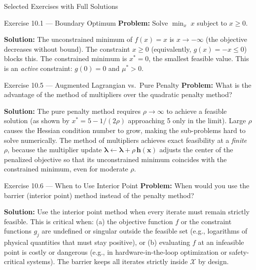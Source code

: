 \documentclass[aspectratio=169,10pt]{beamer}
\newcommand{\bx}{\mathbf{x}}
\newcommand{\blambda}{\bm{\lambda}}
\begin{document}
\begin{frame}[allowframebreaks]{Selected Exercises with Full Solutions}

  \begin{block}{Exercise 10.1 --- Boundary Optimum}
    \textbf{Problem:} Solve $\min_x\; x$ subject to $x \ge 0$.

    \medskip
    \textbf{Solution:}  The unconstrained minimum of $f(x) = x$ is
    $x \to -\infty$ (the objective decreases without bound).  The constraint
    $x \ge 0$ (equivalently, $g(x) = -x \le 0$) blocks this.  The constrained
    minimum is $x^* = 0$, the smallest feasible value.  This is an
    \emph{active} constraint: $g(0) = 0$ and $\mu^* > 0$.
  \end{block}

  \begin{block}{Exercise 10.5 --- Augmented Lagrangian vs.\ Pure Penalty}
    \textbf{Problem:} What is the advantage of the method of multipliers over
    the quadratic penalty method?

    \medskip
    \textbf{Solution:}  The pure penalty method requires $\rho \to \infty$ to
    achieve a feasible solution (as shown by $x^* = 5 - 1/(2\rho)$
    approaching 5 only in the limit).  Large $\rho$ causes the Hessian
    condition number to grow, making the sub-problems hard to solve
    numerically.  The method of multipliers achieves exact feasibility at a
    \emph{finite} $\rho$, because the multiplier update
    $\blambda \leftarrow \blambda + \rho\,\mathbf{h}(\bx)$ adjusts the center
    of the penalized objective so that its unconstrained minimum coincides with
    the constrained minimum, even for moderate $\rho$.
  \end{block}

  \framebreak

  \begin{block}{Exercise 10.6 --- When to Use Interior Point}
    \textbf{Problem:} When would you use the barrier (interior point) method
    instead of the penalty method?

    \medskip
    \textbf{Solution:}  Use the interior point method when every iterate must
    remain strictly feasible.  This is critical when:
    (a) the objective function $f$ or the constraint functions $g_j$ are
    undefined or singular outside the feasible set (e.g., logarithms of
    physical quantities that must stay positive), or
    (b) evaluating $f$ at an infeasible point is costly or dangerous
    (e.g., in hardware-in-the-loop optimization or safety-critical systems).
    The barrier keeps all iterates strictly inside $\mathcal{X}$ by design.
  \end{block}


\end{frame}
\end{document}
